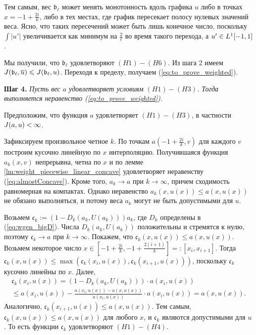 Тем самым, вес $\mathfrak  b_{\ell}$ может менять монотонность вдоль графика $u$
либо в точках $x = -1 + \frac{2 i}{k}$, либо в тех местах, где график пересекает полосу нулевых значений веса.
Ясно, что таких пересечений может быть лишь конечное число, поскольку
$\int |u'|$ увеличивается как минимум на $\frac{2}{\ell}$ во время такого перехода, а $u' \in L^1[-1, 1]$.

Мы получили, что $\mathfrak b_{\ell}$ удовлетворяют $(H1)-(H6)$.
Из шага 2 имеем $\IWg(\mathfrak b_{\ell}, \mon{u}) \le \IWg(\mathfrak b_{\ell}, u)$.
Переходя к пределу, получаем (\ref{eq:to_prove_weighted}).

\bigskip
\textbf{Шаг 4.}
\textit{Пусть вес $a$ удовлетворяет условиям $(H1)-(H3)$.
Тогда выполняется неравенство (\ref{eq:to_prove_weighted}).}

Предположим, что функция  $a$ удовлетворяет $(H1)-(H3)$, в частности $J(a, u) < \infty$.

Зафиксируем произвольное четное $k$.
По точкам $a(-1 + \frac{2i}{k}, v)$ для каждого $v$ построим кусочно линейную по $x$ интерполяцию.
Получившаяся функция $a_k(x, v)$ непрерывна, четна по $x$
и по лемме \ref{lm:weight_piecewise_linear_concave} удовлетворяет неравенству (\ref{eq:almostConcave}).
Кроме того, $a_k \to a$ при $k \to \infty$, причем сходимость равномерная на компактах.
Однако неравенство $a_k(x, u(x)) \le a(x, u(x))$ не обязано выполняться,
и потому веса $a_k$ могут не быть допустимыми для $u$.

Возьмем $\mathfrak c_k := (1 - D_k(a_k, U(a_k))) a_k$, где $D_k$ определены в (\ref{eq:wgen_bigD}).
Числа $D_k(a_k, U(a_k))$ положительны и стремятся к нулю, поэтому $\mathfrak c_k \to a$ при $k \to \infty$.
Покажем, что $\mathfrak c_k(x, u(x)) \le a(x, u(x))$.
Возьмем некоторое число
$x \in [-1 + \frac{2i}{k}, -1 + \frac{2(i + 1)}{k}] =: [x_i, x_{i + 1}]$.
Тогда $\mathfrak c_k(x, u(x)) \le \max( \mathfrak c_k(x_i, u(x)), \mathfrak c_k(x_{i + 1}, u(x)) )$,
поскольку $\mathfrak c_k$ кусочно линейны по $x$.
Далее,
\begin{multline*}
\mathfrak c_k(x_i, u(x)) = ( 1 - D_k(a_k, U(a_k))) \cdot a(x_i, u(x)) \\
\le a(x_i, u(x)) - \frac{a(x_i, u(x)) - a(x, u(x))}{a(x_i, u(x))} \cdot a(x_i, u(x)) = a(x, u(x)).
\end{multline*}
Аналогично, $\mathfrak c_k(x_{i + 1}, u(x)) \le a(x, u(x))$.
Тем самым, $\mathfrak c_k(x, u(x)) \le a(x, u(x))$ для любого $x$, и $\mathfrak c_k$ являются допустимыми для $u$.
То есть функции $\mathfrak c_k$ удовлетворяют $(H1)-(H4)$.

